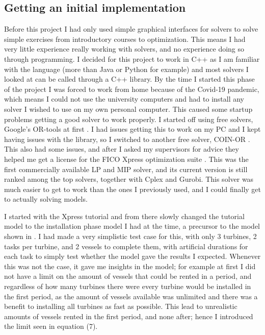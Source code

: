 \documentclass[a4paper,12pt]{article}
\begin{document}
\subsection{Getting an initial implementation}
Before this project I had only used simple graphical interfaces for solvers to solve simple exercises from introductory courses to optimization. This means I had very little experience really working with solvers, and no experience doing so through programming. I decided for this project to work in C++ as I am familiar with the language (more than Java or Python for example) and most solvers I looked at can be called through a C++ library. By the time I started this phase of the project I was forced to work from home because of the Covid-19 pandemic, which means I could not use the university computers and had to install any solver I wished to use on my own personal computer. This caused some startup problems getting a good solver to work properly. I started off using free solvers, Google's OR-tools at first \cite{ortools}. I had issues getting this to work on my PC and I kept having issues with the library, so I switched to another free solver, COIN-OR \cite{coinor}. This also had some issues, and after I asked my supervisors for advice they helped me get a license for the FICO Xpress optimization suite \cite{ficoxp}. This was the first commercially available LP and MIP solver, and its current version is still ranked among the top solvers, together with Cplex and Gurobi. This solver was much easier to get to work than the ones I previously used, and I could finally get to actually solving models. 

I started with the Xpress tutorial and from there slowly changed the tutorial model to the installation phase model I had at the time, a precursor to the model shown in . I had made a very simplistic test case for this, with only 3 turbines, 2 tasks per turbine, and 2 vessels to complete them, with artificial durations for each task to simply test whether the model gave the results I expected. Whenever this was not the case, it gave me insights in the model; for example at first I did not have a limit on the amount of vessels that could be rented in a period, and regardless of how many turbines there were every turbine would be installed in the first period, as the amount of vessels available was unlimited and there was a benefit to installing all turbines as fast as possible. This lead to unrealistic amounts of vessels rented in the first period, and none after; hence I introduced the limit seen in equation (7). 
\end{document}
